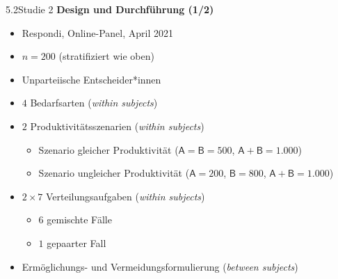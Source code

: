 \documentclass[xcolor=table,9pt,aspectratio=169]{beamer}
\begin{document}
\begin{frame}{\vspace*{10mm}5.2\hspace*{1em}Studie 2}
\textbf{Design und Durchführung (1/2)}\\
\medskip
\begin{itemize}
   \item Respondi, Online-Panel, April 2021
   \item $n=200$ (stratifiziert wie oben)
   \item Unparteiische Entscheider*innen
   \item $4$ Bedarfsarten (\textit{within subjects})
   \item $2$ Produktivitätsszenarien (\textit{within subjects})
   \begin{itemize}
      \item Szenario gleicher Produktivität ($\textsf{A}=\textsf{B}=500$, $\textsf{A}+\textsf{B}=1.000$)
      \item Szenario ungleicher Produktivität ($\textsf{A}=200$, $\textsf{B}=800$, $\textsf{A}+\textsf{B}=1.000$)
   \end{itemize}
   \item $2\times7$ Verteilungsaufgaben (\textit{within subjects})
   \begin{itemize}
      \item $6$ gemischte Fälle
      \item $1$ gepaarter Fall
   \end{itemize}
   \item Ermöglichungs- und Vermeidungsformulierung (\textit{between subjects})
\end{itemize}
\end{frame}
\end{document}
